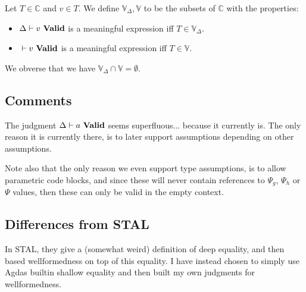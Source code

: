 
\fbox{$\valid{}{\Psi}$}
\begin{mathpar}
\end{mathpar}


\begin{definition}
  Let $T \in \mathbb{C}$ and $v \in T$.  We define
  $\mathbb{V}_\Delta, \mathbb{V}$ to be the subsets of $\mathbb{C}$
  with the properties:
  \begin{itemize}
  \item $\valid{\Delta}{v}$ is a meaningful expression iff $T \in \mathbb{V}_\Delta$.
  \item $\valid{}{v}$ is a meaningful expression iff $T \in \mathbb{V}$.
  \end{itemize}
\end{definition}

We obverse that we have $\mathbb{V}_\Delta \cap \mathbb{V} = \emptyset$.

\subsection{Comments}
The judgment $\valid{\Delta}{a}$ seems superfluous... because it currently
is. The only reason it is currently there, is to later support assumptions
depending on other assumptions.

Note also that the only reason we even support type assumptions, is to allow
parametric code blocks, and since these will never contain references to
$\Psi_g$, $\Psi_h$ or $\Psi$ values, then these can only be valid in the empty
context.

\subsection{Differences from STAL}

In STAL, they give a (somewhat weird) definition of deep equality, and then
based wellformedness on top of this equality. I have instead chosen to simply
use Agdas builtin shallow equality and then built my own judgments for
wellformedness.
